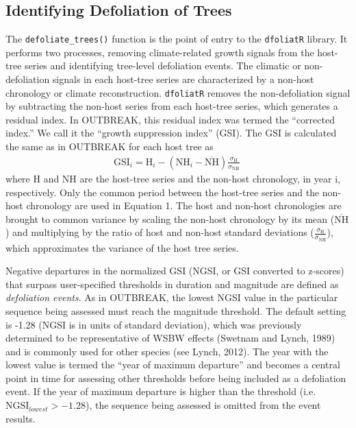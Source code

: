 \documentclass[review]{elsarticle} %
\begin{document}
\hypertarget{identifying-defoliation-of-trees}{%
\subsection{Identifying Defoliation of Trees}\label{identifying-defoliation-of-trees}}

The \texttt{defoliate\_trees()} function is the point of entry to the \texttt{dfoliatR} library. It performs two processes, removing climate-related growth signals from the host-tree series and identifying tree-level defoliation events. The climatic or non-defoliation signals in each host-tree series are characterized by a non-host chronology or climate reconstruction. \texttt{dfoliatR} removes the non-defoliation signal by subtracting the non-host series from each host-tree series, which generates a residual index. In OUTBREAK, this residual index was termed the ``corrected index.'' We call it the ``growth suppression index'' (GSI). The GSI is calculated the same as in OUTBREAK for each host tree as
\begin{align}
\textrm{GSI}_{i} = \textrm{H}_{i} - \left( \textrm{NH}_{i} - \overline{\textrm{NH}} \right) \frac{\sigma_{\textrm{H}}}{\sigma_{\textrm{NH}}} \
\end{align}
where H and NH are the host-tree series and the non-host chronology, in year i, respectively. Only the common period between the host-tree series and the non-host chronology are used in Equation 1. The host and non-host chronologies are brought to common variance by scaling the non-host chronology by its mean (\(\overline{\textrm{NH}}\)) and multiplying by the ratio of host and non-host standard deviations (\(\frac{\sigma_{\textrm{H}}}{\sigma_{\textrm{NH}}}\)), which approximates the variance of the host tree series.

Negative departures in the normalized GSI (NGSI, or GSI converted to z-scores) that surpass user-specified thresholds in duration and magnitude are defined as \emph{defoliation events}. As in OUTBREAK, the lowest NGSI value in the particular sequence being assessed must reach the magnitude threshold. The default setting is -1.28 (NGSI is in units of standard deviation), which was previously determined to be representative of WSBW effects (Swetnam and Lynch, 1989) and is commonly used for other species (see Lynch, 2012). The year with the lowest value is termed the ``year of maximum departure'' and becomes a central point in time for assessing other thresholds before being included as a defoliation event. If the year of maximum departure is higher than the threshold (i.e.~\(\textrm{NGSI}_{lowest} > -1.28\)), the sequence being assessed is omitted from the event results.
\end{document}
